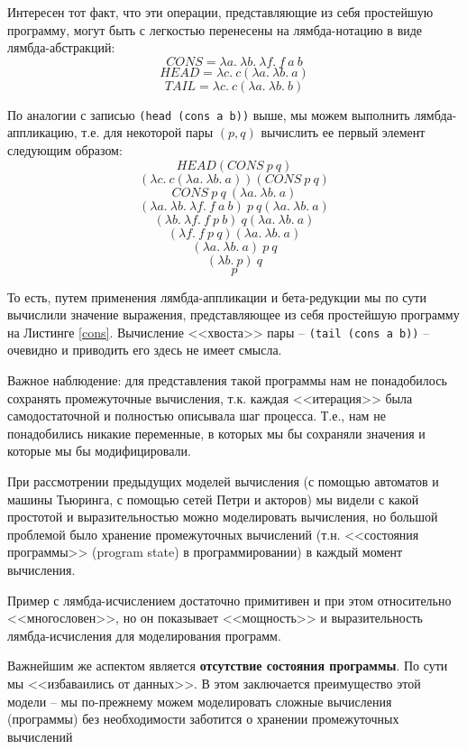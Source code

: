 \documentclass[a4paper,14pt]{extreport} %
\begin{document}
Интересен тот факт, что эти операции, представляющие из себя простейшую программу, могут быть с легкостью перенесены на лямбда-нотацию в виде лямбда-абстракций:
$$CONS=\lambda a . \ \lambda b . \ \lambda f . \ f \ a \ b$$
$$HEAD=\lambda c . \ c (\lambda a . \ \lambda b . \ a)$$
$$TAIL=\lambda c . \ c (\lambda a . \ \lambda b . \ b)$$

По аналогии с записью \texttt{(head (cons a b))} выше, мы можем выполнить лямбда-аппликацию, т.е. для некоторой пары $(p,q)$ вычислить ее первый элемент следующим образом:
$$HEAD(CONS \ p \ q)$$
$$(\lambda c . \ c (\lambda a . \ \lambda b . \ a))(CONS \ p \ q)$$
$$CONS \ p \ q \ (\lambda a . \ \lambda b . \ a)$$
$$(\lambda a . \ \lambda b . \ \lambda f . \ f \ a \ b) \ p \ q (\lambda a . \ \lambda b . \ a)$$
$$(\lambda b . \ \lambda f . \ f \ p \ b) \ q (\lambda a . \ \lambda b . \ a)$$
$$(\lambda f . \ f \ p \ q) (\lambda a . \ \lambda b . \ a)$$
$$(\lambda a . \ \lambda b . \ a) \ p \ q$$
$$(\lambda b . \ p) \ q$$
$$p$$

То есть, путем применения лямбда-аппликации и бета-редукции мы по сути вычислили значение выражения, представляющее из себя простейшую программу на Листинге \ref{cons}. Вычисление <<хвоста>> пары --  \texttt{(tail (cons a b))} -- очевидно и приводить его здесь не имеет смысла.

Важное наблюдение: для представления такой программы нам не понадобилось сохранять промежуточные вычисления, т.к. каждая <<итерация>> была самодостаточной и полностью описывала шаг процесса. Т.е., нам не понадобились никакие переменные, в которых мы бы сохраняли значения и которые мы бы модифицировали.

При рассмотрении предыдущих моделей вычисления (с помощью автоматов и машины Тьюринга, с помощью сетей Петри и акторов) мы видели с какой простотой и выразительностью можно моделировать вычисления, но большой проблемой было хранение промежуточных вычислений (т.н. <<состояния программы>> (program state) в программировании) в каждый момент вычисления.

Пример с лямбда-исчислением достаточно примитивен и при этом относительно <<многословен>>, но он показывает <<мощность>> и выразительность лямбда-исчисления для моделирования программ.

Важнейшим же аспектом является \textbf{отсутствие состояния программы}. По сути мы <<избаваились от данных>>. В этом заключается преимущество этой модели -- мы по-прежнему можем моделировать сложные вычисления (программы) без необходимости заботится о хранении промежуточных вычислений
\end{document}
